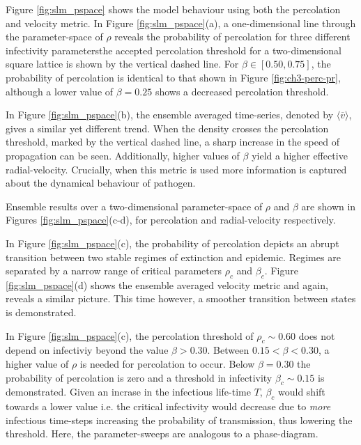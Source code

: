 Figure \ref{fig:slm_pspace} shows the model behaviour using both the percolation and velocity metric. %
In Figure \ref{fig:slm_pspace}(a), a one-dimensional line through the parameter-space of $\rho$ reveals the probability of percolation for three different infectivity parameters\textemdash the accepted percolation threshold for a two-dimensional square lattice is shown by the vertical dashed line. %
For $\beta \in [0.50, 0.75]$, the probability of percolation is identical to that shown in Figure \ref{fig:ch3-perc-pr}, although a lower value of $\beta = 0.25$ shows a decreased percolation threshold. %

In Figure \ref{fig:slm_pspace}(b), the ensemble averaged time-series, denoted by $\big\langle \overline{v} \big\rangle$, gives a similar yet different trend. %
When the density crosses the percolation threshold, marked by the vertical dashed line, a sharp increase in the speed of propagation can be seen. Additionally, higher values of $\beta$ yield a higher effective radial-velocity. %
Crucially, when this metric is used more information is captured about the dynamical behaviour of pathogen. %

Ensemble results over a two-dimensional parameter-space of $\rho$ and $\beta$ are shown in Figures \ref{fig:slm_pspace}(c-d), %
for percolation and radial-velocity respectively. %

In Figure \ref{fig:slm_pspace}(c), the probability of percolation depicts an abrupt transition between two stable regimes of extinction and epidemic. %
Regimes are separated by a narrow range of critical parameters $\rho_c$ and $\beta_c$. Figure \ref{fig:slm_pspace}(d) shows the ensemble averaged velocity metric and again, %
reveals a similar picture. %
This time however, a smoother transition between states is demonstrated. %

In Figure \ref{fig:slm_pspace}(c), the percolation threshold of $\rho_c \sim 0.60$ does not depend on infectiviy beyond the value $\beta>0.30$. %
Between $0.15 <\beta<0.30$, a higher value of $\rho$ is needed for percolation to occur. %
Below $\beta=0.30$ the probability of percolation is zero and a threshold in infectivity $\beta_c \sim 0.15$ is demonstrated. %
Given an incrase in the infectious life-time $T$, $\beta_c$ would shift towards a lower value %
 i.e. the critical infectivity would decrease due to \textit{more} infectious time-steps %
 increasing the probability of transmission, thus lowering the threshold. %
 Here, the parameter-sweeps are analogous to a phase-diagram. %

